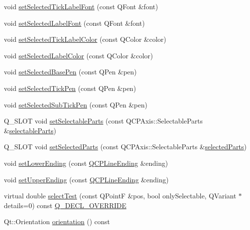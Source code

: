 \begin{DoxyCompactItemize}
void \hyperlink{class_q_c_p_axis_a845ccb560b7bc5281098a5be494145f6}{set\+Selected\+Tick\+Label\+Font} (const Q\+Font \&font)
\item 
void \hyperlink{class_q_c_p_axis_a02ec2a75d4d8401eaab834fbc6803d30}{set\+Selected\+Label\+Font} (const Q\+Font \&font)
\item 
void \hyperlink{class_q_c_p_axis_a9bdbf5e63ab15187f3a1de9440129227}{set\+Selected\+Tick\+Label\+Color} (const Q\+Color \&color)
\item 
void \hyperlink{class_q_c_p_axis_a5d502dec597c634f491fdd73d151c72d}{set\+Selected\+Label\+Color} (const Q\+Color \&color)
\item 
void \hyperlink{class_q_c_p_axis_aeb917a909215605b95ef2be843de1ee8}{set\+Selected\+Base\+Pen} (const Q\+Pen \&pen)
\item 
void \hyperlink{class_q_c_p_axis_a8360502685eb782edbf04019c9345cdc}{set\+Selected\+Tick\+Pen} (const Q\+Pen \&pen)
\item 
void \hyperlink{class_q_c_p_axis_a2a00a7166600155eac26843132eb9576}{set\+Selected\+Sub\+Tick\+Pen} (const Q\+Pen \&pen)
\item 
Q\+\_\+\+S\+L\+OT void \hyperlink{class_q_c_p_axis_a513f9b9e326c505d9bec54880031b085}{set\+Selectable\+Parts} (const Q\+C\+P\+Axis\+::\+Selectable\+Parts \&\hyperlink{class_q_c_p_axis_a1d12d157756c114f4e57517c62177181}{selectable\+Parts})
\item 
Q\+\_\+\+S\+L\+OT void \hyperlink{class_q_c_p_axis_ab9d7a69277dcbed9119b3c1f25ca19c3}{set\+Selected\+Parts} (const Q\+C\+P\+Axis\+::\+Selectable\+Parts \&\hyperlink{class_q_c_p_axis_a893e8d6cfed9267eb2b793cb1d2b4dce}{selected\+Parts})
\item 
void \hyperlink{class_q_c_p_axis_a08af1c72db9ae4dc8cb8a973d44405ab}{set\+Lower\+Ending} (const \hyperlink{class_q_c_p_line_ending}{Q\+C\+P\+Line\+Ending} \&ending)
\item 
void \hyperlink{class_q_c_p_axis_a69119b892fc306f651763596685aa377}{set\+Upper\+Ending} (const \hyperlink{class_q_c_p_line_ending}{Q\+C\+P\+Line\+Ending} \&ending)
\item 
virtual double \hyperlink{class_q_c_p_axis_a63b7103c57fe9acfbce164334ea837f8}{select\+Test} (const Q\+PointF \&pos, bool only\+Selectable, Q\+Variant $\ast$details=0) const \hyperlink{qcustomplot_8h_a42cc5eaeb25b85f8b52d2a4b94c56f55}{Q\+\_\+\+D\+E\+C\+L\+\_\+\+O\+V\+E\+R\+R\+I\+DE}
\item 
Qt\+::\+Orientation \hyperlink{class_q_c_p_axis_ab988ef4538e2655bb77bd138189cd42e}{orientation} () const
\item 

\end{DoxyCompactItemize}
